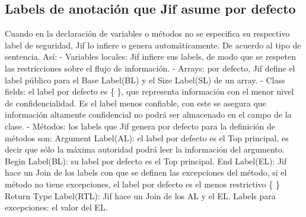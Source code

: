 \subsection{Labels de anotación que Jif asume por defecto}
\label{sssec:default-labels}
Cuando en la declaración de variables o métodos no se especifica su respectivo
label de seguridad, Jif lo infiere o genera automáticamente. De acuerdo al tipo
de sentencia. Así:\newline
- Variables locales: Jif infiere sus labels, de modo que se respeten las
restricciones sobre el flujo de información.\newline
- Arrays: por defecto, Jif define el label público para el Base Label(BL) y el
Size Label(SL) de un array.\newline
- Class fields: el label por defecto es \{ \}, que representa información con el
menor nivel de confidencialidad. Es el label menos confiable, con este se
asegura que información altamente confidencial no podrá ser almacenado en el
campo de la clase.\newline
- Métodos: los labels que Jif genera por defecto para la definición de
métodos son:\newline 
Argument Label(AL): el label por defecto es el Top principal, es decir que sólo
la máxima autoridad podrá leer la información del argumento.\newline 
Begin Label(BL): su label por defecto es el Top principal.\newline
End Label(EL): Jif hace un Join de los labels con que se definen las
excepciones del método, si el método no tiene excepciones, el label por defecto
es el menos restrictivo \{ \}\newline
Return Type Label(RTL): Jif hace un Join de los AL y el EL.\newline
Labels para excepciones: el valor del EL.\newline




